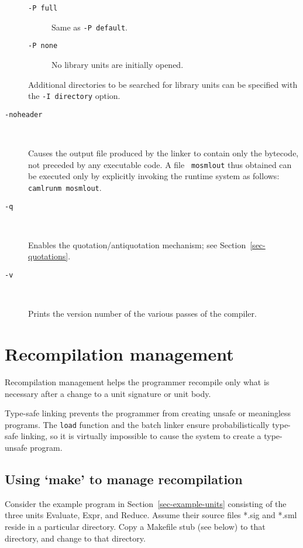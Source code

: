 \documentclass[fleqn]{article}
\begin{document}
\begin{description}
\begin{description}
  \item[{\tt -P full}] Same as {\tt -P default}.

  \item[{\tt -P none}] No library units are initially opened.
  \end{description}
  
  Additional directories to be searched for library units can be
  specified with the {\tt -I {\rm directory}} option.

\item[{\tt -noheader}]\mbox{ }

  Causes the output file produced by the linker to contain only the
  bytecode, not preceded by any executable code.  A file {\tt
    mosmlout} thus obtained can be executed only by explicitly
  invoking the runtime system as follows: {\tt camlrunm mosmlout}.

\item[{\tt -q}]\mbox{ }

  Enables the quotation/antiquotation mechanism; see
  Section~\ref{sec-quotations}.

\item[{\tt -v}]\mbox{ }

 Prints the version number of the various passes of the
  compiler.
\end{description}


\section{Recompilation management}
\label{sec-recompilation-guide}

Recompilation management helps the programmer recompile only what is
necessary after a change to a unit signature or unit body.  

Type-safe linking prevents the programmer from creating unsafe or
meaningless programs.  The {\tt load} function and the batch linker
ensure probabilistically type-safe linking, so it is virtually
impossible to cause the system to create a type-unsafe program.  


\subsection{Using `make' to manage recompilation}
\label{sec-using-make}

Consider the example program in Section~\ref{sec-example-units}
consisting of the three units Evaluate, Expr, and Reduce.  Assume
their source files *.sig and *.sml reside in a particular directory.
Copy a Makefile stub (see below) to that directory, and change to that
directory.
\end{document}
